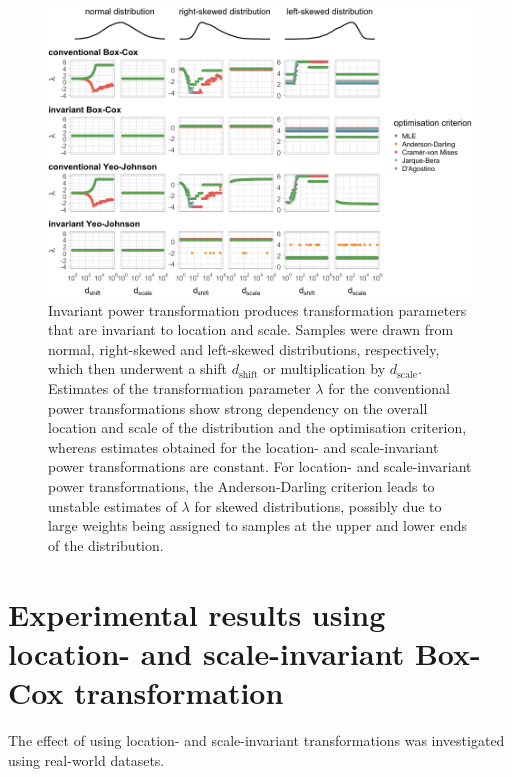 \documentclass[preprint,12pt,authoryear]{elsarticle}
\begin{document}
\begin{figure}

{\centering \includegraphics{figure_appendix_1} 

}

\caption{Invariant power transformation produces transformation parameters that are invariant to location and scale. Samples were drawn from normal, right-skewed and left-skewed distributions, respectively, which then underwent a shift $d_{\text{shift}}$ or multiplication by $d_{\text{scale}}$. Estimates of the transformation parameter $\lambda$ for the conventional power transformations show strong dependency on the overall location and scale of the distribution and the optimisation criterion, whereas estimates obtained for the location- and scale-invariant power transformations are constant. For location- and scale-invariant power transformations, the Anderson-Darling criterion leads to unstable estimates of $\lambda$ for skewed distributions, possibly due to large weights being assigned to samples at the upper and lower ends of the distribution.}\label{fig:shifted-distributions-appendix}
\end{figure}

\section{Experimental results using location- and scale-invariant Box-Cox transformation}
\label{appendix-d-experimental-results-using-location--and-scale-invariant-box-cox-transformation}

The effect of using location- and scale-invariant transformations was
investigated using real-world datasets.
\end{document}
